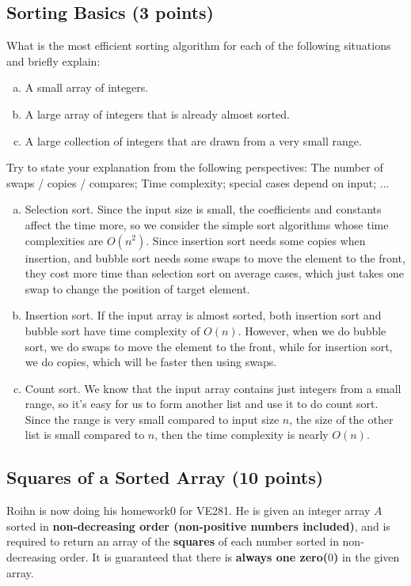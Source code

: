\documentclass[11pt]{exam}
\begin{document}
\subsection{Sorting Basics (3 points)}
What is the most efficient sorting algorithm for each of the following situations and briefly explain:
\begin{enumerate}[(a)]
\item A small array of integers.
\item A large array of integers that is already almost sorted.
\item A large collection of integers that are drawn from a very small range.
\end{enumerate}
Try to state your explanation from the following perspectives: The number of swaps / copies / compares; Time complexity; special cases depend on input; ...
\begin{solution}
\begin{enumerate}[(a)]
    \item Selection sort. Since the input size is small, the coefficients and constants affect the time more, so we consider the simple sort algorithms whose time complexities are $O(n^{2})$. Since insertion sort needs some copies when insertion, and bubble sort needs some swaps to move the element to the front, they cost more time than selection sort on average cases, which just takes one swap to change the position of target element.
    \item Insertion sort. If the input array is almost sorted, both insertion sort and bubble sort have time complexity of $O(n)$. However, when we do bubble sort, we do swaps to move the element to the front, while for insertion sort, we do copies, which will be faster then using swaps.
    \item Count sort. We know that the input array contains just integers from a small range, so it's easy for us to form another list and use it to do count sort. Since the range is very small compared to input size $n$, the size of the other list is small compared to $n$, then the time complexity is nearly $O(n)$.
    \end{enumerate}
\end{solution}

\subsection{Squares of a Sorted Array (10 points)}
Roihn is now doing his homework0 for VE281. He is given an integer array $A$ sorted in \textbf{non-decreasing order (non-positive numbers included)}, and is required to return an array of the \textbf{squares} of each number sorted in non-decreasing order. It is guaranteed that there is \textbf{always one zero($0$)} in the given array. 
\end{document}

